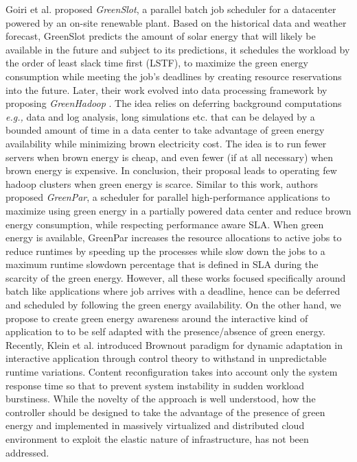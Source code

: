 Goiri et al. \cite{GreenSlot} proposed \emph{GreenSlot}, a parallel batch job scheduler for a datacenter powered by an on-site renewable plant. Based on the historical data and weather forecast, GreenSlot predicts the amount of solar energy that will likely be available in the future and subject to its predictions, it schedules the workload by the order of least slack time first (LSTF), to maximize the green energy consumption while meeting the job's deadlines by creating resource reservations into the future. Later, their work evolved into data processing framework by proposing \emph{GreenHadoop} \cite{GreenHadoop}. The idea relies on deferring background
computations \emph{e.g.,} data and log analysis, long simulations etc. that can be delayed by a bounded amount of time in a data center to take advantage of green energy availability while minimizing brown electricity cost. The idea is to run fewer servers when brown energy is cheap, and even fewer (if at all necessary) when brown energy is expensive. In conclusion, their proposal leads to operating few
hadoop clusters when green energy is scarce. 
Similar to this work, authors \cite{GreenPar} proposed \emph{GreenPar}, a scheduler for parallel high-performance applications to maximize using green energy in a partially powered data center and reduce brown energy consumption, while respecting performance aware SLA.  When green energy is available, GreenPar increases the resource allocations to active jobs to reduce runtimes by speeding up the processes while slow down the jobs to a maximum runtime slowdown percentage that is defined in SLA during the scarcity of the green energy. However, all these works focused specifically around batch like applications where job arrives with a deadline, hence can be deferred and scheduled by following the green energy availability. On the other hand, we propose to create green energy awareness around the interactive kind of application to to be self adapted with the presence/absence of green energy. Recently, Klein et al. \cite{brownout} introduced Brownout paradigm for dynamic adaptation in interactive application through control theory to withstand in
unpredictable runtime variations. Content reconfiguration takes into account only the system response time so that to prevent system instability in sudden workload burstiness. While the novelty of the approach is well understood,
how the controller should be designed to take the advantage of the presence of green energy and 
implemented in
massively virtualized and distributed cloud environment to exploit the elastic nature of infrastructure,
has not been addressed.


